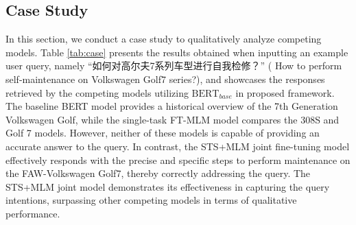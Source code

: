 \documentclass[mathematics,article,submit,moreauthors]{Definitions/mdpi}
\newcommand{\1}[1]{\mathds{1}\left[#1\right]}
\newcommand{\tableref}[1]{Table \ref{#1}}
\begin{document}
\subsection{Case Study}
In this section,  we conduct a case study to qualitatively analyze competing models. 
\tableref{tab:case} presents the results obtained when inputting an example user query, 
namely ``如何对高尔夫7系列车型进行自我检修？'' ({\color{blue} How to perform self-maintenance on Volkswagen Golf7 series?}), and showcases the responses retrieved by the competing models utilizing $\text{BERT}_{base}$ in proposed framework.
The baseline BERT model provides a historical overview of the 7th Generation Volkswagen Golf, while the single-task FT-MLM model compares the 308S and Golf 7 models. However, neither of these models is capable of providing an accurate answer to the query. In contrast, the STS+MLM joint fine-tuning model effectively responds with the precise and specific steps to perform maintenance on the FAW-Volkswagen Golf7, thereby correctly addressing the query.
The STS+MLM joint model demonstrates its effectiveness in capturing the query intentions, surpassing other competing models in terms of qualitative performance.
\end{document}
